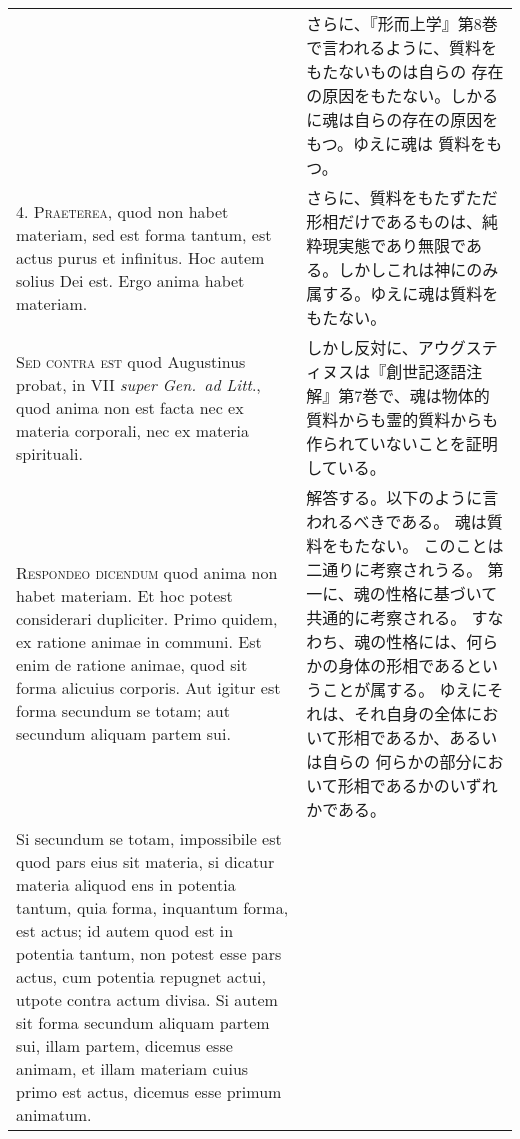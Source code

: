 \documentclass[10pt]{jsarticle} %
\begin{document}
\begin{longtable}{p{21em}p{21em}}
&

さらに、『形而上学』第8巻で言われるように、質料をもたないものは自らの
 存在の原因をもたない。しかるに魂は自らの存在の原因をもつ。ゆえに魂は
 質料をもつ。


\\



4. {\scshape Praeterea}, quod non habet materiam, sed est forma
tantum, est actus purus et infinitus. Hoc autem solius Dei est. Ergo
anima habet materiam.


&

さらに、質料をもたずただ形相だけであるものは、純粋現実態であり無限であ
 る。しかしこれは神にのみ属する。ゆえに魂は質料をもたない。

\\



{\scshape Sed contra est} quod Augustinus probat, in VII {\itshape
super Gen.~ad Litt}., quod anima non est facta nec ex materia
corporali, nec ex materia spirituali.


&

しかし反対に、アウグスティヌスは『創世記逐語注解』第7巻で、魂は物体的
 質料からも霊的質料からも作られていないことを証明している。

\\



{\scshape Respondeo dicendum} quod anima non habet materiam. Et hoc
potest considerari dupliciter. Primo quidem, ex ratione animae in
communi. Est enim de ratione animae, quod sit forma alicuius
corporis. Aut igitur est forma secundum se totam; aut secundum aliquam
partem sui. 


&

解答する。以下のように言われるべきである。
魂は質料をもたない。
このことは二通りに考察されうる。
第一に、魂の性格に基づいて共通的に考察される。
すなわち、魂の性格には、何らかの身体の形相であるということが属する。
ゆえにそれは、それ自身の全体において形相であるか、あるいは自らの
何らかの部分において形相であるかのいずれかである。


\\

Si secundum se totam, impossibile est quod pars eius sit
materia, si dicatur materia aliquod ens in potentia tantum, quia
forma, inquantum forma, est actus; id autem quod est in potentia
tantum, non potest esse pars actus, cum potentia repugnet actui,
utpote contra actum divisa. Si autem sit forma secundum aliquam partem
sui, illam partem, dicemus esse animam, et illam materiam cuius primo
est actus, dicemus esse primum animatum. 




\end{longtable}
\end{document}

